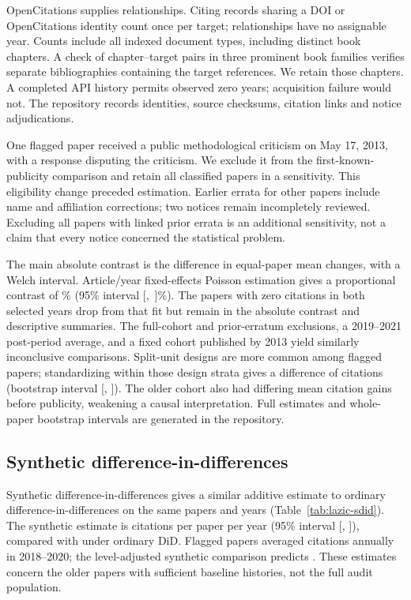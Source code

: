 \documentclass[11pt,letterpaper]{article}
\begin{document}
OpenCitations supplies \LazicLinks{} relationships. Citing records sharing a DOI or OpenCitations identity count once per target; \LazicUndated{} relationships have no assignable year. Counts include all indexed document types, including distinct book chapters. A check of \LazicReviewedChapters{} chapter--target pairs in three prominent book families verifies separate bibliographies containing the target references. We retain those chapters. A completed API history permits observed zero years; acquisition failure would not. The repository records identities, source checksums, citation links and notice adjudications.

One flagged paper received a public methodological criticism on May 17, 2013, with a response disputing the criticism. We exclude it from the first-known-publicity comparison and retain all \LazicClassified{} classified papers in a sensitivity. This eligibility change preceded estimation. Earlier errata for other papers include name and affiliation corrections; two notices remain incompletely reviewed. Excluding all papers with linked prior errata is an additional sensitivity, not a claim that every notice concerned the statistical problem.

The main absolute contrast is the difference in equal-paper mean changes, with a Welch interval. Article/year fixed-effects Poisson estimation gives a proportional contrast of \LazicPercent\% (95\% interval \mbox{[\LazicLower, \LazicUpper]\%}). The \LazicZeroPapers{} papers with zero citations in both selected years drop from that fit but remain in the absolute contrast and descriptive summaries. The full-cohort and prior-erratum exclusions, a 2019--2021 post-period average, and a fixed cohort published by 2013 yield similarly inconclusive comparisons. Split-unit designs are more common among flagged papers; standardizing within those design strata gives a difference of \LazicStratified{} citations (bootstrap interval [\LazicStratifiedLower, \LazicStratifiedUpper]). The older cohort also had differing mean citation gains before publicity, weakening a causal interpretation. Full estimates and whole-paper bootstrap intervals are generated in the repository.


\subsection{Synthetic difference-in-differences}
Synthetic difference-in-differences gives a similar additive estimate to ordinary difference-in-differences on the same papers and years (Table~\ref{tab:lazic-sdid}). The synthetic estimate is \LazicSdidEstimate{} citations per paper per year (95\% interval [\LazicSdidLower, \LazicSdidUpper]), compared with \LazicSdidDid{} under ordinary DiD. Flagged papers averaged \LazicSdidObserved{} citations annually in 2018--2020; the level-adjusted synthetic comparison predicts \LazicSdidCounterfactual{}. These estimates concern the older papers with sufficient baseline histories, not the full audit population.
\end{document}

